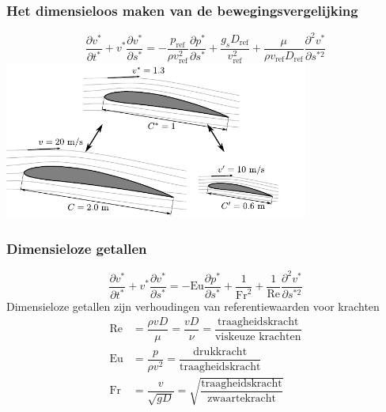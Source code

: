 \documentclass[t]{beamer}
\begin{document}
  	\begin{frame}
		\frametitle{Het dimensieloos maken van de bewegingsvergelijking}
		\vspace{-0.5cm}
		\begin{equation}
			\frac{\partial v^*}{\partial t^*} + v^* \frac{\partial v^*}{\partial s^*} = -\frac{p_{\text{ref}}}{\rho v_{\text{ref}}^2} \frac{\partial p^*}{\partial s^*} + \frac{g_s D_{\text{ref}}}{v_{\text{ref}}^2} + \frac{\mu}{\rho v_{\text{ref}} D_{\text{ref}}} \frac{\partial^2 v^*}{\partial s^{*2}}
			\label{eqn:navier-stokes dimensieloos}
		\end{equation}
		\pause
		\center
        \includegraphics[width=10cm]{fig/gelijkvormigheid/Dimensieloze_stroomlijnen}
	\end{frame}
	\begin{frame}
		\frametitle{Dimensieloze getallen}
		\begin{equation}
			\frac{\partial v^*}{\partial t^*} + v^* \frac{\partial v^*}{\partial s^*} =  -\text{Eu} \frac{\partial p^*}{\partial s^*} + \frac{1}{\text{Fr}^2} + \frac{1}{\text{Re}} \frac{\partial^2 v^*}{\partial s^{*2}}
		\end{equation}
		\pause
		\center
		Dimensieloze getallen zijn verhoudingen van referentiewaarden voor krachten
		\pause
		\vspace{0.5cm}
		\begin{align*}
			\text{Re} &= \dfrac{\rho v D}{\mu} = \dfrac{v D}{\nu} = \dfrac{\text{traagheidskracht}}{\text{viskeuze krachten}} \\
			\text{Eu} &= \dfrac{p}{\rho v^2} = \dfrac{\text{drukkracht}}{\text{traagheidskracht}} \\
			\text{Fr} &= \dfrac{v}{\sqrt{g D}} = \sqrt{\dfrac{\text{traagheidskracht}}{\text{zwaartekracht}}} \\
		\end{align*}
	\end{frame}
\end{document}
